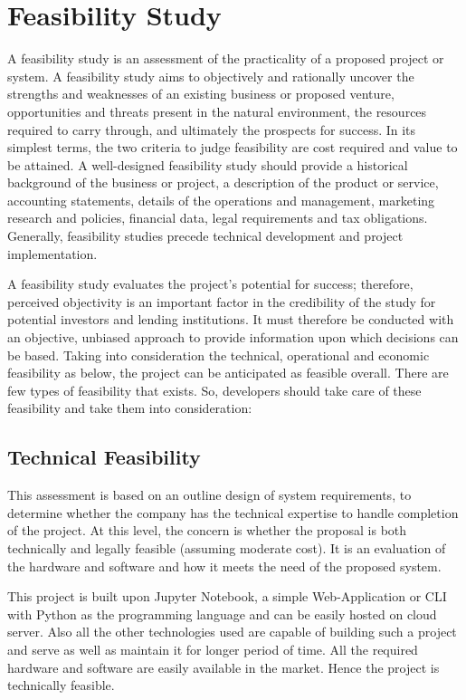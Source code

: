 \section{Feasibility Study}

A feasibility study is an assessment of the practicality of a proposed project or system. A feasibility study aims to objectively and rationally uncover the strengths and weaknesses of an existing business or proposed venture, opportunities and threats present in the natural environment, the resources required to carry through, and ultimately the prospects for success. In its simplest terms, the two criteria to judge feasibility are cost required and value to be attained. A well-designed feasibility study should provide a historical background of the business or project, a description of the product or service, accounting statements, details of the operations and management, marketing research and policies, financial data, legal requirements and tax obligations. Generally, feasibility studies precede technical development and project implementation.

A feasibility study evaluates the project’s potential for success; therefore, perceived objectivity is an important factor in the credibility of the study for potential investors and lending institutions. It must therefore be conducted with an objective, unbiased approach  to provide information upon which decisions can be based. Taking into consideration the technical, operational and economic feasibility as below, the project can be anticipated as feasible overall. There are few types of feasibility that exists. So, developers should take care of these feasibility and take them into consideration:


\subsection{Technical Feasibility}
This assessment is based on an outline design of system requirements, to determine whether the company has the technical expertise to handle completion of the project. At this level, the concern is whether the proposal is both technically and legally feasible (assuming moderate cost). It is an evaluation of the hardware and software and how it meets the need of the proposed system.

This project is built upon Jupyter Notebook, a simple Web-Application or CLI with Python as the programming language and can be easily hosted on cloud server. Also all the other technologies used are capable of building such a project and serve as well as maintain it for longer period of time. All the required hardware and software are easily available in the market. Hence the project is technically feasible.




